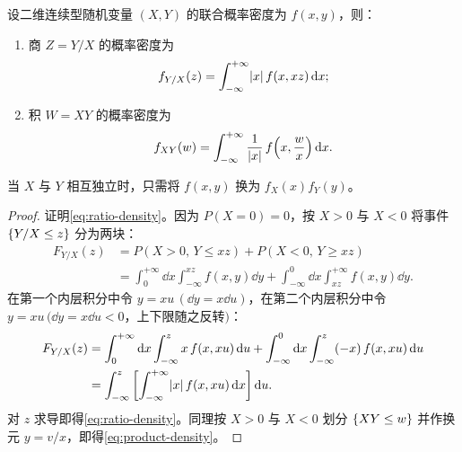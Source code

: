 \begin{theorem}[商与积的密度公式]
\label{thm:ratio-product}
设二维连续型随机变量 $(X,Y)$ 的联合概率密度为 $f(x,y)$，则：
\begin{enumerate}
  \item 商 $Z=Y/X$ 的概率密度为
  \begin{equation}
    f_{Y/X}(z)=\int_{-\infty}^{+\infty}\lvert x\rvert\,f(x,xz)\mathop{}\!\mathrm{d} x;
    \label{eq:ratio-density}
  \end{equation}
  \item 积 $W=XY$ 的概率密度为
  \begin{equation}
    f_{XY}(w)=\int_{-\infty}^{+\infty}\frac{1}{\lvert x\rvert}\,f\!\left(x,\frac{w}{x}\right)\mathop{}\!\mathrm{d} x.
    \label{eq:product-density}
  \end{equation}
\end{enumerate}
当 $X$ 与 $Y$ 相互独立时，只需将 $f(x,y)$ 换为 $f_X(x)f_Y(y)$。
\end{theorem}
\begin{proof}
证明\eqref{eq:ratio-density}。因为 $P(X=0)=0$，按 $X>0$ 与 $X<0$ 将事件 $\{Y/X\le z\}$ 分为两块：
\[
\begin{aligned}
  F_{Y/X}(z)&=P(X>0,\,Y\le xz)+P(X<0,\,Y\ge xz)\\
  &=\int_{0}^{+\infty}\dd x\int_{-\infty}^{xz}f(x,y)\dd y
  +\int_{-\infty}^{0}\dd x\int_{xz}^{+\infty}f(x,y)\dd y.
\end{aligned}
\]
在第一个内层积分中令 $y=xu\,(\dd y=x\dd u)$，在第二个内层积分中令 $y=xu\,(\dd y=x\dd u<0$，上下限随之反转$)$：
\[
\begin{aligned}
  F_{Y/X}(z)&=\int_{0}^{+\infty}\mathop{}\!\mathrm{d} x\int_{-\infty}^{z}x\,f(x,xu)\mathop{}\!\mathrm{d} u
  +\int_{-\infty}^{0}\mathop{}\!\mathrm{d} x\int_{-\infty}^{z}(-x)\,f(x,xu)\mathop{}\!\mathrm{d} u\\
  &=\int_{-\infty}^{z}\left[\int_{-\infty}^{+\infty}\lvert x\rvert\,f(x,xu)\mathop{}\!\mathrm{d} x\right]\mathop{}\!\mathrm{d} u.
\end{aligned}
\]
对 $z$ 求导即得\eqref{eq:ratio-density}。同理按 $X>0$ 与 $X<0$ 划分 $\{XY\le w\}$ 并作换元 $y=v/x$，即得\eqref{eq:product-density}。
\end{proof}

